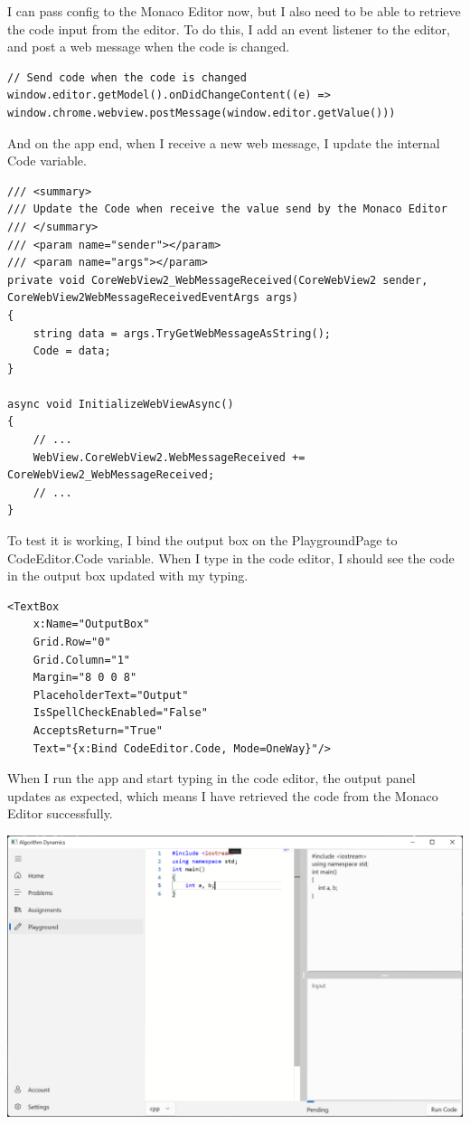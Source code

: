 \documentclass[a4paper]{report}
\begin{document}
I can pass config to the Monaco Editor now, but I also need to be able to retrieve the code input from the editor. To do this, I add an event listener to the editor, and post a web message when the code is changed.

\begin{verbatim}
// Send code when the code is changed
window.editor.getModel().onDidChangeContent((e) => window.chrome.webview.postMessage(window.editor.getValue()))
\end{verbatim}

And on the app end, when I receive a new web message, I update the internal Code variable.

\begin{verbatim}
/// <summary>
/// Update the Code when receive the value send by the Monaco Editor
/// </summary>
/// <param name="sender"></param>
/// <param name="args"></param>
private void CoreWebView2_WebMessageReceived(CoreWebView2 sender, CoreWebView2WebMessageReceivedEventArgs args)
{
    string data = args.TryGetWebMessageAsString();
    Code = data;
}

async void InitializeWebViewAsync()
{
    // ...
    WebView.CoreWebView2.WebMessageReceived += CoreWebView2_WebMessageReceived;
    // ...
}
\end{verbatim}

To test it is working, I bind the output box on the PlaygroundPage to CodeEditor.Code variable. When I type in the code editor, I should see the code in the output box updated with my typing.

\begin{verbatim}
<TextBox
    x:Name="OutputBox"
    Grid.Row="0"
    Grid.Column="1"
    Margin="8 0 0 8"
    PlaceholderText="Output"
    IsSpellCheckEnabled="False"
    AcceptsReturn="True"
    Text="{x:Bind CodeEditor.Code, Mode=OneWay}"/>
\end{verbatim}

When I run the app and start typing in the code editor, the output panel updates as expected, which means I have retrieved the code from the Monaco Editor successfully.

\includegraphics[width=\textwidth, height=\textheight, keepaspectratio]{PlaygroundPage-Editor-CodeSync}
\end{document}
